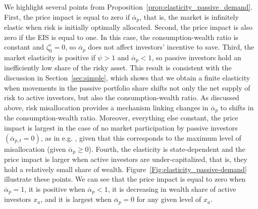 We highlight several points from Proposition~\ref{prop:elasticity_passive_demand}. First, the price impact is equal to zero if $\overline{\alpha}_p$, that is, the market is infinitely elastic when risk is initially optimally allocated. Second, the price impact is also zero if the EIS is equal to one. 
In this case, the consumption-wealth ratio is constant and $\zeta_0^c = 0$, so $\overline{\alpha}_p$ does not affect investors' incentive to save.
Third, the market elasticity is positive if $\psi > 1$ and $\overline{\alpha}_p < 1$, so passive investors hold an inefficiently low share of the risky asset. 
This result is consistent with the discussion in Section~\ref{sec:simple}, which shows that we obtain a finite elasticity when movements in the passive portfolio share shifts not only the net supply of risk to active investors, but also the consumption-wealth ratio. 
As discussed above, risk misallocation provides a mechanism linking changes in $\overline{\alpha}_p$ to shifts in the consumption-wealth ratio. 
Moreover, everything else constant, the price impact is largest in the case of no market participation by passive investors $(\overline{\alpha}_{p,t} = 0)$, as in e.g. \citet{basak1998equilibrium}, given that this corresponds to the maximum level of misallocation (given $\overline{\alpha}_p\geq 0$).
Fourth, the elasticity is state-dependent and the price impact is larger when active investors are under-capitalized, that is, they hold a relatively small share of wealth. 
Figure~\ref{Fig:elasticity_passive-demand} illustrate these points. We can see that the price impact is equal to zero when $\overline{\alpha}_p = 1$, it is positive when $\overline{\alpha}_p < 1$, it is decreasing in wealth share of active investors $x_a$, and it is largest when $\overline{\alpha}_p = 0$ for any given level of $x_a$.


